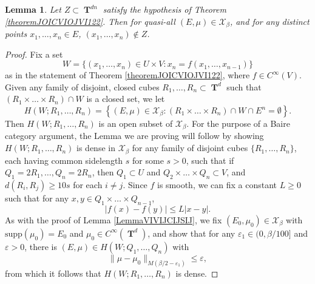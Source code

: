 \documentclass[dvipsnames,letterpaper,12pt]{article}
\numberwithin{equation}{section}
\DeclareMathOperator{\TT}{\mathbf{T}}
\newtheorem{lemma}[theorem]{Lemma}
\numberwithin{theorem}{section}
\begin{document}
\begin{lemma} \label{lemmaOIOICJOIJOISJOIJS}
    Let $Z \subset \TT^{dn}$ satisfy the hypothesis of Theorem \ref{theoremJOICVIOJVI122}. Then for quasi-all $(E,\mu) \in \mathcal{X}_\beta$, and for any distinct points $x_1,\dots,x_n \in E$, $(x_1,\dots,x_n) \not \in Z$.
\end{lemma}
\begin{proof}
    Fix a set
    \[ W = \{ (x_1,\dots,x_n) \in U \times V : x_n = f(x_1,\dots,x_{n-1}) \} \]
    as in the statement of Theorem \ref{theoremJOICVIOJVI122}, where $f \in C^\infty(V)$. Given any family of disjoint, closed cubes $R_1,\dots,R_n \subset \TT^d$ such that $(R_1 \times \dots \times R_n) \cap W$ is a closed set, we let
    \begin{equation}
        H(W;R_1,\dots,R_n) = \left\{ (E,\mu) \in \mathcal{X}_\beta: (R_1 \times \dots \times R_n) \cap W \cap E^n = \emptyset \right\}.
    \end{equation}
    Then $H(W;R_1,\dots,R_n)$ is an open subset of $\mathcal{X}_\beta$. For the purpose of a Baire category argument, the Lemma we are proving will follow by showing $H(W;R_1,\dots,R_n)$ is dense in $\mathcal{X}_\beta$ for any family of disjoint cubes $\{ R_1,\dots, R_n \}$, each having common sidelength $s$ for some $s > 0$, such that if $Q_1 = 2R_1,\dots,Q_n = 2R_n$, then $Q_1 \subset U$ and $Q_2 \times \dots \times Q_n \subset V$, and $d(R_i,R_j) \geq 10s$ for each $i \neq j$. Since $f$ is smooth, we can fix a constant $L \geq 0$ such that for any $x,y \in Q_1 \times \dots \times Q_{n-1}$,
    \[ |f(x) - f(y)| \leq L|x - y|. \]
    As with the proof of Lemma \ref{LemmaVIVIJCIJSIJ}, we fix $(E_0,\mu_0) \in \mathcal{X}_\beta$ with $\text{supp}(\mu_0) = E_0$ and $\mu_0 \in C^\infty(\TT^d)$, and show that for any $\varepsilon_1 \in (0,\beta/100]$ and $\varepsilon > 0$, there is $(E,\mu) \in H(W;Q_1,\dots,Q_n)$ with
    \begin{equation}
        \| \mu - \mu_0 \|_{M(\beta/2-\varepsilon_1)} \leq \varepsilon,
    \end{equation}
    from which it follows that $H(W;R_1,\dots,R_n)$ is dense.


\end{proof}
\end{document}
